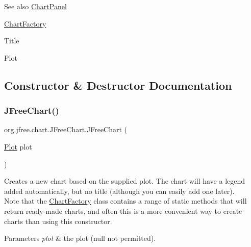 \begin{DoxySeeAlso}{See also}
\mbox{\hyperlink{classorg_1_1jfree_1_1chart_1_1_chart_panel}{Chart\+Panel}} 

\mbox{\hyperlink{classorg_1_1jfree_1_1chart_1_1_chart_factory}{Chart\+Factory}} 

Title 

Plot 
\end{DoxySeeAlso}


\subsection{Constructor \& Destructor Documentation}
\mbox{\label{classorg_1_1jfree_1_1chart_1_1_j_free_chart_a21ac385ae4cbb4cdea92b15732c3fadf}} 
\subsubsection{\texorpdfstring{J\+Free\+Chart()}{JFreeChart()}\hspace{0.1cm}{\footnotesize\ttfamily [1/3]}}
{\footnotesize\ttfamily org.\+jfree.\+chart.\+J\+Free\+Chart.\+J\+Free\+Chart (\begin{DoxyParamCaption}\item[{\mbox{\hyperlink{classorg_1_1jfree_1_1chart_1_1plot_1_1_plot}{Plot}}}]{plot }\end{DoxyParamCaption})}

Creates a new chart based on the supplied plot. The chart will have a legend added automatically, but no title (although you can easily add one later). ~\newline
~\newline
 Note that the \mbox{\hyperlink{classorg_1_1jfree_1_1chart_1_1_chart_factory}{Chart\+Factory}} class contains a range of static methods that will return ready-\/made charts, and often this is a more convenient way to create charts than using this constructor.


\begin{DoxyParams}{Parameters}
{\em plot} & the plot ({\ttfamily null} not permitted). \\
\hline
\end{DoxyParams}
\mbox{\label{classorg_1_1jfree_1_1chart_1_1_j_free_chart_a2909eb0091816ddf207fa7bad8e035f9}} 
